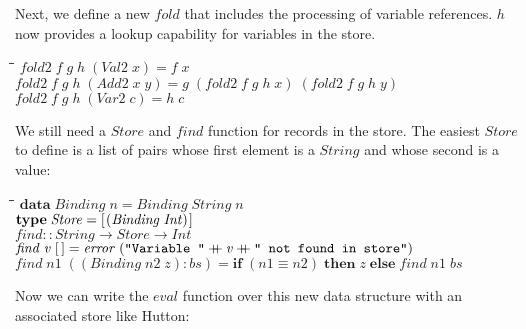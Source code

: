 \documentclass[10pt]{article}
\newlength{\lwidth}\setlength{\lwidth}{4.5cm}
\newlength{\cwidth}\setlength{\cwidth}{8mm} %
\newcommand{\Conid}[1]{\mathit{#1}}
\newcommand{\Varid}[1]{\mathit{#1}}
\newcommand{\plus}{\mathbin{+\!\!\!+}}
\begin{document}
Next, we define a new \ensuremath{\Varid{fold}} that includes the processing of variable
references.  \ensuremath{\Varid{h}} now provides a lookup capability for variables in the
store.

\begin{tabbing}
\qquad\=\hspace{\lwidth}\=\hspace{\cwidth}\=\+\kill
${\Varid{fold2}\;\Varid{f}\;\Varid{g}\;\Varid{h}\;(\Conid{Val2}\;\Varid{x})\mathrel{=}\Varid{f}\;\Varid{x}}$\\
${\Varid{fold2}\;\Varid{f}\;\Varid{g}\;\Varid{h}\;(\Conid{Add2}\;\Varid{x}\;\Varid{y})\mathrel{=}\Varid{g}\;(\Varid{fold2}\;\Varid{f}\;\Varid{g}\;\Varid{h}\;\Varid{x})\;(\Varid{fold2}\;\Varid{f}\;\Varid{g}\;\Varid{h}\;\Varid{y})}$\\
${\Varid{fold2}\;\Varid{f}\;\Varid{g}\;\Varid{h}\;(\Conid{Var2}\;\Varid{c})\mathrel{=}\Varid{h}\;\Varid{c}}$
\end{tabbing}
We still need a \ensuremath{\Conid{Store}} and \ensuremath{\Varid{find}} function for records in the store.
The easiest \ensuremath{\Conid{Store}} to define is a list of pairs whose first element
is a \ensuremath{\Conid{String}} and whose second is a value:

\begin{tabbing}
\qquad\=\hspace{\lwidth}\=\hspace{\cwidth}\=\+\kill
${\mathbf{data}\;\Conid{Binding}\;\Varid{n}\mathrel{=}\Conid{Binding}\;\Conid{String}\;\Varid{n}}$\\
${}$\\
${\mathbf{type}\;\Conid{Store}\mathrel{=}[\mskip1.5mu (\Conid{Binding}\;\Conid{Int})\mskip1.5mu]}$\\
${}$\\
${\Varid{find}\mathbin{::}\Conid{String}\to \Conid{Store}\to \Conid{Int}}$\\
${\Varid{find}\;\Varid{v}\;[\mskip1.5mu \mskip1.5mu]\mathrel{=}\Varid{error}\;(\text{\tt \char34 Variable~\char34}\plus \Varid{v}\plus \text{\tt \char34 ~not~found~in~store\char34})}$\\
${\Varid{find}\;\Varid{n1}\;((\Conid{Binding}\;\Varid{n2}\;\Varid{z})\mathbin{:}\Varid{bs})\mathrel{=}\mathbf{if}\;(\Varid{n1}\equiv \Varid{n2})\;\mathbf{then}\;\Varid{z}\;\mathbf{else}\;\Varid{find}\;\Varid{n1}\;\Varid{bs}}$
\end{tabbing}
Now we can write the \ensuremath{\Varid{eval}} function over this new data structure with
an associated store like Hutton:
\end{document}
